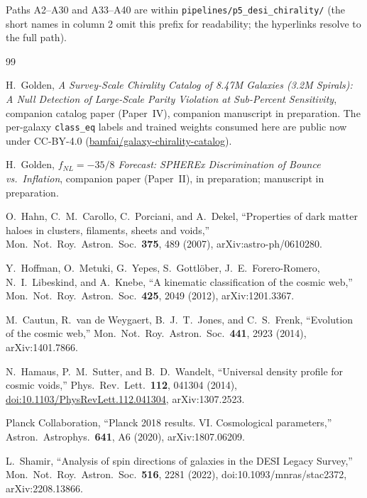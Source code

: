 \documentclass[aps,prd,twocolumn,superscriptaddress,showpacs,preprintnumbers,nofootinbib,longbibliography,floatfix]{revtex4-2}
\newcommand{\paperIVarxiv}{companion manuscript in preparation}
\begin{document}
Paths A2--A30 and A33--A40 are within \texttt{pipelines/p5\_desi\_chirality/} (the
short names in column 2 omit this prefix for readability; the hyperlinks
resolve to the full path).

\begin{thebibliography}{99}

H.~Golden,
\emph{A Survey-Scale Chirality Catalog of 8.47M Galaxies (3.2M Spirals):
A Null Detection of Large-Scale Parity Violation at Sub-Percent
Sensitivity}, companion catalog paper (Paper~IV), \paperIVarxiv{}.
The per-galaxy \texttt{class\_eq} labels and trained weights consumed here are
public now under CC-BY-4.0 (\href{https://huggingface.co/datasets/bamfai/galaxy-chirality-catalog}{bamfai/galaxy-chirality-catalog}).

H.~Golden,
\emph{$f_{NL} = -35/8$ Forecast: SPHEREx Discrimination of Bounce vs.\
Inflation}, companion paper (Paper~II), in preparation; manuscript in preparation.

O.~Hahn, C.~M.~Carollo, C.~Porciani, and A.~Dekel,
``Properties of dark matter haloes in clusters, filaments, sheets and
voids,'' Mon.\ Not.\ Roy.\ Astron.\ Soc.\ \textbf{375}, 489 (2007),
arXiv:astro-ph/0610280.

Y.~Hoffman, O.~Metuki, G.~Yepes, S.~Gottl\"ober, J.~E.~Forero-Romero,
N.~I.~Libeskind, and A.~Knebe,
``A kinematic classification of the cosmic web,''
Mon.\ Not.\ Roy.\ Astron.\ Soc.\ \textbf{425}, 2049 (2012),
arXiv:1201.3367.

M.~Cautun, R.~van de Weygaert, B.~J.~T.~Jones, and C.~S.~Frenk,
``Evolution of the cosmic web,''
Mon.\ Not.\ Roy.\ Astron.\ Soc.\ \textbf{441}, 2923 (2014),
arXiv:1401.7866.

N.~Hamaus, P.~M.~Sutter, and B.~D.~Wandelt,
``Universal density profile for cosmic voids,''
Phys.\ Rev.\ Lett.\ \textbf{112}, 041304 (2014),
\href{https://doi.org/10.1103/PhysRevLett.112.041304}{doi:10.1103/PhysRevLett.112.041304},
arXiv:1307.2523.

Planck Collaboration,
``Planck 2018 results. VI. Cosmological parameters,''
Astron.\ Astrophys.\ \textbf{641}, A6 (2020),
arXiv:1807.06209.

L.~Shamir,
``Analysis of spin directions of galaxies in the DESI Legacy
Survey,''
Mon.\ Not.\ Roy.\ Astron.\ Soc.\ \textbf{516}, 2281 (2022),
doi:10.1093/mnras/stac2372, arXiv:2208.13866.


\end{thebibliography}
\end{document}
